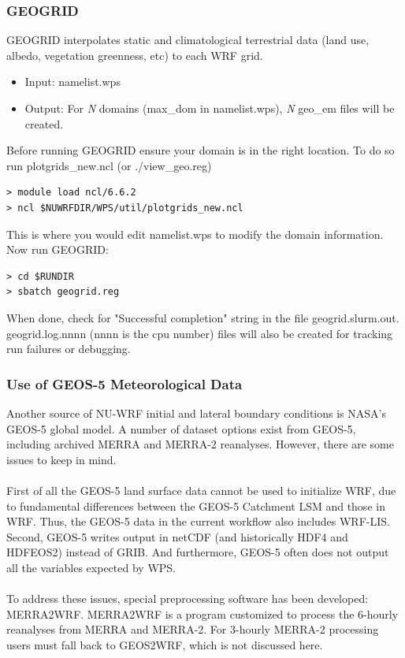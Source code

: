 \begin{frame}[fragile]\frametitle{GEOGRID}

\scriptsize{
GEOGRID interpolates static and climatological terrestrial data (land use, albedo, vegetation greenness, etc) to each WRF grid.
\begin{itemize}
\item Input: namelist.wps
\item Output: For \emph{N} domains (max\_dom in namelist.wps), \emph{N} geo\_em files will be created.
\end{itemize}\scriptsize}    
\hrulefill\par
\scriptsize{Before running GEOGRID ensure your domain is in the right location. To do so run plotgrids\_new.ncl} (or ./view\_geo.reg)
\verbatimfont{\scriptsize}%
\begin{verbatim}
> module load ncl/6.6.2
> ncl $NUWRFDIR/WPS/util/plotgrids_new.ncl
\end{verbatim}
\scriptsize{This is where you would edit namelist.wps to modify the domain information.
Now run GEOGRID:}
\verbatimfont{\scriptsize}%
\begin{verbatim}
> cd $RUNDIR
> sbatch geogrid.reg
\end{verbatim}
When done, check for  "Successful completion"  string in the file geogrid.slurm.out.
geogrid.log.nnnn (nnnn is the cpu number) files will also be created for tracking run failures or debugging.

\end{frame}

\begin{frame}[fragile]\frametitle{Use of GEOS-5 Meteorological Data}

\footnotesize{
Another  source of NU-WRF initial and lateral boundary conditions is NASA's GEOS-5 global
model. A number of dataset options exist from GEOS-5, including 
archived MERRA  and MERRA-2 reanalyses. However, there are some issues to keep in mind.\\
\mbox{}\\
First of all the GEOS-5 land surface data cannot be used to initialize WRF, due to fundamental 
differences between the GEOS-5 Catchment LSM and those in WRF. 
Thus, the GEOS-5 data in the current workflow also includes WRF-LIS. 
Second, GEOS-5 writes output in netCDF (and historically HDF4 and HDFEOS2) instead
of GRIB. And furthermore, GEOS-5 often does not output all the variables expected by
WPS.\\
\mbox{}\\
To address these issues, special preprocessing software has been developed: 
MERRA2WRF. MERRA2WRF is a program customized to process the 6-hourly
reanalyses from MERRA and MERRA-2. For 3-hourly MERRA-2 processing users must fall back 
to GEOS2WRF, which is not discussed here.}

\end{frame}

